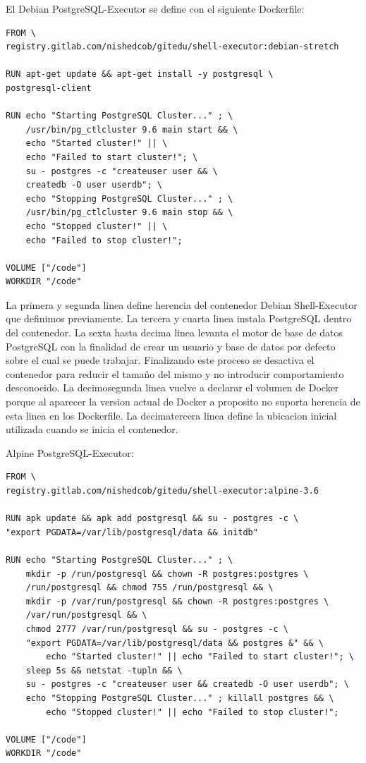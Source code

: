 El Debian PostgreSQL-Executor se define con el siguiente Dockerfile:
\begin{lstlisting}
FROM \
registry.gitlab.com/nishedcob/gitedu/shell-executor:debian-stretch

RUN apt-get update && apt-get install -y postgresql \
postgresql-client

RUN echo "Starting PostgreSQL Cluster..." ; \
    /usr/bin/pg_ctlcluster 9.6 main start && \
    echo "Started cluster!" || \
    echo "Failed to start cluster!"; \
    su - postgres -c "createuser user && \
    createdb -O user userdb"; \
    echo "Stopping PostgreSQL Cluster..." ; \
    /usr/bin/pg_ctlcluster 9.6 main stop && \
    echo "Stopped cluster!" || \
    echo "Failed to stop cluster!";

VOLUME ["/code"]
WORKDIR "/code"
\end{lstlisting}
La primera y segunda linea define herencia del contenedor Debian Shell-Executor que definimos previamente. La tercera y cuarta linea instala PostgreSQL dentro del contenedor. La sexta hasta decima linea levanta el motor de base de datos PostgreSQL con la finalidad de crear un usuario y base de datos por defecto sobre el cual se puede trabajar. Finalizando este proceso se desactiva el contenedor para reducir el tamaño del mismo y no introducir comportamiento desconocido. La decimosegunda linea vuelve a declarar el volumen de Docker porque al aparecer la version actual de Docker a proposito no suporta herencia de esta linea en los Dockerfile. La decimatercera linea define la ubicacion inicial utilizada cuando se inicia el contenedor.

Alpine PostgreSQL-Executor:
\begin{lstlisting}
FROM \
registry.gitlab.com/nishedcob/gitedu/shell-executor:alpine-3.6

RUN apk update && apk add postgresql && su - postgres -c \
"export PGDATA=/var/lib/postgresql/data && initdb"

RUN echo "Starting PostgreSQL Cluster..." ; \
    mkdir -p /run/postgresql && chown -R postgres:postgres \
    /run/postgresql && chmod 755 /run/postgresql && \
    mkdir -p /var/run/postgresql && chown -R postgres:postgres \
    /var/run/postgresql && \
    chmod 2777 /var/run/postgresql && su - postgres -c \
    "export PGDATA=/var/lib/postgresql/data && postgres &" && \
        echo "Started cluster!" || echo "Failed to start cluster!"; \
    sleep 5s && netstat -tupln && \
    su - postgres -c "createuser user && createdb -O user userdb"; \
    echo "Stopping PostgreSQL Cluster..." ; killall postgres && \
        echo "Stopped cluster!" || echo "Failed to stop cluster!";

VOLUME ["/code"]
WORKDIR "/code"
\end{lstlisting}

